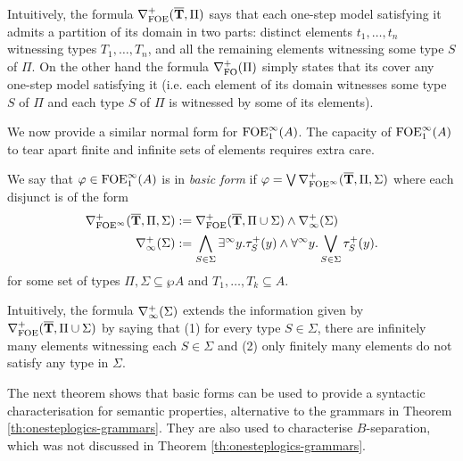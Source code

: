 Intuitively, the formula $\nabla^+_{\mathrm{FOE}}(\overline{{\mathbf{T}}},\Pi)$ says that each one-step model satisfying it admits a partition of its domain in two parts: distinct elements $t_1,\dots,t_n$ witnessing types $T_1,\dots,T_n$, and all the remaining elements witnessing some type $S$ of $\Pi$.  On the other hand the formula $\nabla^+_{\mathrm{FO}}(\Pi)$ simply states that its cover any one-step model satisfying it (i.e.  each element of its domain witnesses some type $S$ of $\Pi$ and each type $S$ of $\Pi$ is witnessed by some of its elements).

We now provide a similar normal form for $\mathrm{FOE}^{\infty}_1(A)$. The capacity of $\mathrm{FOE}^{\infty}_1(A)$ to tear apart finite and infinite sets of elements requires extra care.

\begin{definition}\label{def:basicform-ofoei}
We say that $\varphi \in \mathrm{FOE}^{\infty}_1(A)$ is in \emph{basic form} if $\varphi = \bigvee \nabla^+_{\mathrm{FOE}^{\infty}}(\overline{{\mathbf{T}}},\Pi,\Sigma)$ where each disjunct is of the form
\begin{align*}
	\nabla^+_{\mathrm{FOE}^{\infty}}(\overline{{\mathbf{T}}},\Pi,\Sigma) &:= \nabla^+_{\mathrm{FOE}}(\overline{{\mathbf{T}}},\Pi \cup \Sigma) \land \nabla^+_\infty(\Sigma)\\
	\nabla^+_\infty(\Sigma) &:= \bigwedge_{S\in\Sigma} \exists^\infty y.\tau^{+}_S(y) \land \forall^\infty y.\bigvee_{S\in\Sigma} \tau^{+}_S(y) .
\end{align*}
for some set of types $\Pi,\Sigma \subseteq \wp A$ and $T_1, \dots, T_k \subseteq A$.
\end{definition}

Intuitively, the formula $\nabla^+_\infty(\Sigma)$ extends the information given by $\nabla^+_{\mathrm{FOE}}(\overline{{\mathbf{T}}},\Pi \cup \Sigma)$ by saying that (1) for every type $S\in\Sigma$, there are infinitely many elements witnessing each $S \in \Sigma$ and (2) only finitely many elements do not satisfy any type in $\Sigma$. 

The next theorem shows that basic forms can be used to provide a syntactic characterisation for semantic properties, alternative to the grammars in Theorem \ref{th:onesteplogics-grammars}. They are also used to characterise $B$-separation, which was not discussed in Theorem \ref{th:onesteplogics-grammars}.

